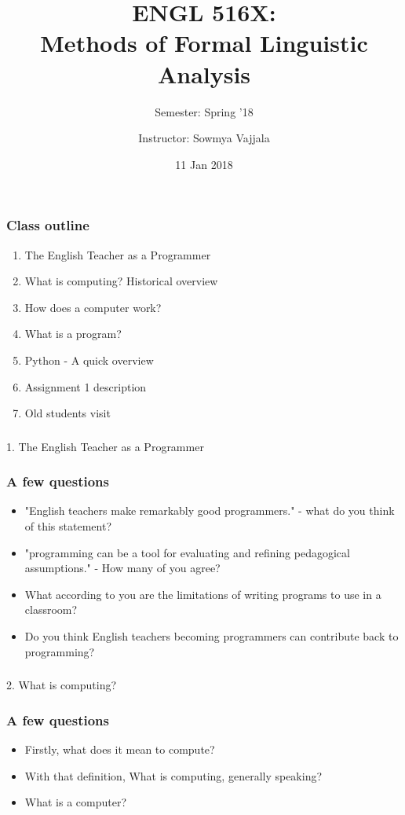 \documentclass{beamer}
\author[Sowmya Vajjala]{Instructor: Sowmya Vajjala}
\title[ENGL 516X]{ENGL 516X: \\ Methods of Formal Linguistic Analysis}
\subtitle{Semester: Spring '18}
\date{11 Jan 2018}
\institute{Iowa State University, USA}
\begin{document}
\begin{frame}\titlepage
\end{frame}

\begin{frame}
\frametitle{Class outline}
\begin{enumerate}
\item The English Teacher as a Programmer
\item What is computing? Historical overview
\item How does a computer work?
\item What is a program?
\item Python - A quick overview
\item Assignment 1 description
\item Old students visit
\end{enumerate}
\end{frame}

\begin{frame}
\frametitle{}
\begin{center}
\Large 1. The English Teacher as a Programmer
\end{center}
\end{frame}

\begin{frame}
\frametitle{A few questions}
\begin{itemize}
\item "English teachers make remarkably good programmers." - what do you think of this statement?
\pause
\item "programming can be a tool for evaluating and refining pedagogical assumptions." - How many of you agree?
\pause
\item What according to you are the limitations of writing programs to use in a classroom? 
\pause
\item Do you think English teachers becoming programmers can contribute back to programming?
\end{itemize}
\end{frame}


\begin{frame}
\frametitle{}
\begin{center}
\Large 2. What is computing?
\end{center}
\end{frame}

\begin{frame}
\frametitle{A few questions}
\begin{itemize}
\item Firstly, what does it mean to compute? 
\pause
\item With that definition, What is computing, generally speaking?
\pause
\item What is a computer? 
\pause 
\end{itemize}
\end{frame}
\end{document}
